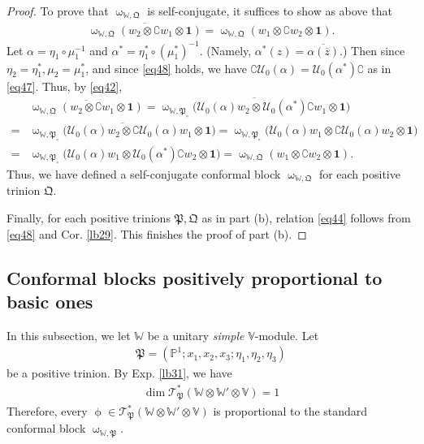 \documentclass[11pt,b5paper,notitlepage]{article}
\theoremstyle{definition}
\theoremstyle{plain}
\newcommand{\fk}{\mathfrak}
\newcommand{\mc}{\mathcal}
\newcommand{\ovl}{\overline}
\newcommand{\id}{\mathbf{1}}
\newcommand{\scr}{\mathscr}
\newcommand{\Co}{\complement}
\newcommand{\Vbb}{\mathbb V}
\newcommand{\Wbb}{\mathbb W}
\newcommand{\Pbb}{\mathbb P}
\numberwithin{equation}{section}
\begin{document}
\begin{proof}
To prove that $\upomega_{\Wbb,\fk Q}$ is self-conjugate, it suffices to show as above that
\begin{align*}
\ovl{\upomega_{\Wbb,\fk Q}(w_2\otimes\Co w_1\otimes \id)}=\upomega_{\Wbb,\fk Q}(w_1\otimes \Co w_2\otimes \id).
\end{align*}
Let $\alpha=\eta_1\circ\mu_1^{-1}$ and $\alpha^*=\eta_1^*\circ(\mu_1^*)^{-1}$. (Namely, $\alpha^*(z)=\ovl{\alpha(\ovl z)}$.) Then since $\eta_2=\eta_1^*,\mu_2=\mu_1^*$,  and since \eqref{eq48} holds, we have $\Co \mc U_0(\alpha)=\mc U_0 (\alpha^*)\Co$ as in \eqref{eq47}. Thus, by \eqref{eq42},
\begin{align*}
&\ovl{\upomega_{\Wbb,\fk Q}(w_2\otimes\Co w_1\otimes \id)}=\ovl{\upomega_{\Wbb,\fk P_\circ}\big(\mc U_0(\alpha)w_2\otimes \mc U_0(\alpha^*)\Co w_1\otimes \id\big)}\\
=&\ovl{\upomega_{\Wbb,\fk P_\circ}\big(\mc U_0(\alpha)w_2\otimes \Co\mc U_0(\alpha) w_1\otimes \id\big)}=\upomega_{\Wbb,\fk P_\circ}\big(\mc U_0(\alpha) w_1\otimes \Co\mc U_0(\alpha)w_2\otimes \id\big)\\
=&\upomega_{\Wbb,\fk P_\circ}\big(\mc U_0(\alpha) w_1\otimes \mc U_0(\alpha^*)\Co w_2\otimes \id\big)=\upomega_{\Wbb,\fk Q}(w_1\otimes \Co w_2\otimes \id).
\end{align*}
Thus, we have defined a self-conjugate conformal block $\upomega_{\Wbb,\fk Q}$ for each positive trinion $\fk Q$. 

Finally, for each positive trinions $\fk P,\fk Q$ as in part (b), relation \eqref{eq44} follows from \eqref{eq48} and Cor. \ref{lb29}. This finishes the proof of part (b).
\end{proof}



\subsection{Conformal blocks positively proportional to basic ones}


In this subsection, we let $\Wbb$ be a unitary \emph{simple} $\Vbb$-module. Let
\begin{align*}
\fk P=(\Pbb^1;x_1,x_2,x_3;\eta_1,\eta_2,\eta_3)
\end{align*}
be a positive trinion. By Exp. \ref{lb31}, we have
\begin{align*}
\dim \scr T_{\fk P}^*(\Wbb\otimes\Wbb'\otimes\Vbb)=1
\end{align*}
Therefore, every $\upphi\in\scr T_{\fk P}^*(\Wbb\otimes\Wbb'\otimes\Vbb)$ is proportional to the standard conformal block $\upomega_{\Wbb,\fk P}$.
\end{document}
